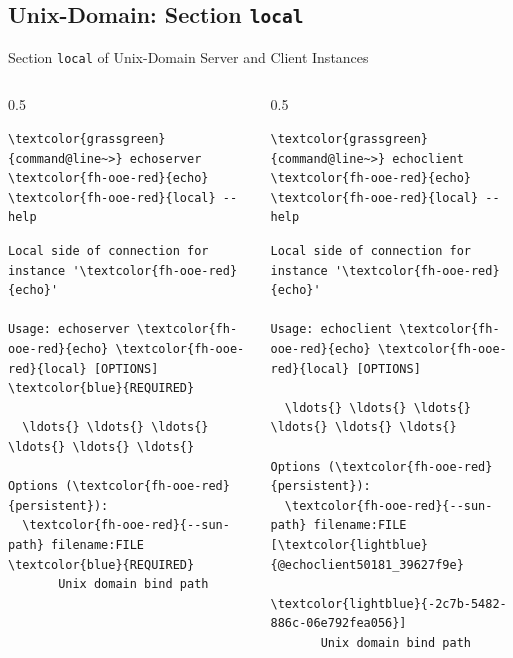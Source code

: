 \subsection{Unix-Domain: Section \textcolor{fh-ooe-red}{\lstinline|local|}}

\begin{frame}[fragile]{Section \alert{\lstinline|local|} of Unix-Domain Server and Client Instances}
\begin{columns}[T, onlytextwidth]
\begin{column}{0.5\textwidth}
\begin{scriptsize}
\begin{Verbatim}[commandchars=\\\{\}]
\textcolor{grassgreen}{command@line~>} echoserver \textcolor{fh-ooe-red}{echo} \textcolor{fh-ooe-red}{local} --help
\end{Verbatim}
\begin{Verbatim}[commandchars=\\\{\},frame=leftline,rulecolor=\color{fh-ooe-red}]
Local side of connection for instance '\textcolor{fh-ooe-red}{echo}'

Usage: echoserver \textcolor{fh-ooe-red}{echo} \textcolor{fh-ooe-red}{local} [OPTIONS] \textcolor{blue}{REQUIRED}

  \ldots{} \ldots{} \ldots{} \ldots{} \ldots{} \ldots{}

Options (\textcolor{fh-ooe-red}{persistent}):
  \textcolor{fh-ooe-red}{--sun-path} filename:FILE \textcolor{blue}{REQUIRED}
       Unix domain bind path
\end{Verbatim}
\end{scriptsize}
\end{column}
\begin{column}{0.5\textwidth}
\begin{scriptsize}
\begin{Verbatim}[commandchars=\\\{\}]
\textcolor{grassgreen}{command@line~>} echoclient \textcolor{fh-ooe-red}{echo} \textcolor{fh-ooe-red}{local} --help
\end{Verbatim}
\begin{Verbatim}[commandchars=\\\{\},frame=leftline,rulecolor=\color{fh-ooe-red}]
Local side of connection for instance '\textcolor{fh-ooe-red}{echo}'

Usage: echoclient \textcolor{fh-ooe-red}{echo} \textcolor{fh-ooe-red}{local} [OPTIONS]

  \ldots{} \ldots{} \ldots{} \ldots{} \ldots{} \ldots{}

Options (\textcolor{fh-ooe-red}{persistent}):
  \textcolor{fh-ooe-red}{--sun-path} filename:FILE [\textcolor{lightblue}{@echoclient50181_39627f9e}
                            \textcolor{lightblue}{-2c7b-5482-886c-06e792fea056}]
       Unix domain bind path
\end{Verbatim}
\end{scriptsize}
\end{column}
\end{columns}
\end{frame}
